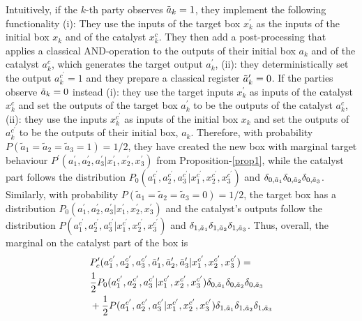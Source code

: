\documentclass[pra,aps,reprint,superscriptaddress]{revtex4-2}
\theoremstyle{theorem}
\begin{document}
 Intuitively, if the $k$-th party observes $\Tilde{a}_k=1$, they implement the following functionality (i): They use the inputs of the target box $x^\prime_k$ as the inputs of the initial box $x_k$ and of the catalyst $x^c_k$. They then add a post-processing that applies a classical AND-operation to the outputs of their initial box $a_k$ and of the catalyst $a^c_k$, which generates the target output $a^\prime_k$, (ii): they deterministically set the output $a^{c^\prime}_k=1$ and they prepare a classical register $\Tilde{a}^\prime_k = 0$.  If the parties observe $\Tilde{a}_k=0$ instead (i): they use the target inputs $x_k^\prime$ as inputs of the catalyst $x^c_k$ and set the outputs of the target box $a^\prime_k$ to be the outputs of the catalyst $a^c_k$, (ii): they use the inputs $x^{c^\prime}_k$ as inputs of the initial box $x_k$ and set the outputs of  $a^{c^\prime}_k$ to be the outputs of their initial box, $a_k$. Therefore, with probability $P(\tilde a_1 = \tilde a_2= \tilde a_3=1)=1/2$, they have created the new box with marginal target behaviour $P^{\prime}(a^{\prime}_1,a^{\prime}_2,a^{\prime}_3|x^{\prime}_1,x^{\prime}_2,x^{\prime}_3)$ from Proposition-\ref{prop1}, while the catalyst part follows the distribution $P_0(a^{c^\prime}_1,a^{c^\prime}_2,a^{c^\prime}_3|x^{c^\prime}_1,x^{c^\prime}_2,x^{c^\prime}_3)$ and $\delta_{0,\Tilde{a}_1}\delta_{0,\Tilde{a}_2}\delta_{0,\Tilde{a}_3}$. Similarly, with probability $P(\tilde a_1 = \tilde a_2= \tilde a_3=0)=1/2$, the target box has a distribution $P_0(a^{\prime}_1,a^{\prime}_2,a^{\prime}_3|x^{\prime}_1,x^{\prime}_2,x^{\prime}_3)$ and the catalyst's outputs follow the distribution $P(a^{c^\prime}_1,a^{c^\prime}_2,a^{c^\prime}_3|x^{c^\prime}_1,x^{c^\prime}_2,x^{c^\prime}_3)$ and $\delta_{1,\Tilde{a}_1}\delta_{1,\Tilde{a}_2}\delta_{1,\Tilde{a}_3}$. Thus, overall, the marginal on the catalyst part of the box is
\begin{align}\nonumber
    &P_c^{\prime}(a^{c^\prime}_1,a^{c^\prime}_2,a^{c^\prime}_3,\Tilde{a}^\prime_1,\Tilde{a}^\prime_2,\Tilde{a}^\prime_3|x^{c^\prime}_1,x^{c^\prime}_2,x^{c^\prime}_3)=\\&\nonumber\frac{1}{2}P_0(a^{c^\prime}_1,a^{c^\prime}_2,a^{c^\prime}_3|x^{c^\prime}_1,x^{c^\prime}_2,x^{c^\prime}_3)\delta_{0,\Tilde{a}_1}\delta_{0,\Tilde{a}_2}\delta_{0,\Tilde{a}_3}\\&+
    \frac{1}{2}P(a^{c^\prime}_1,a^{c^\prime}_2,a^{c^\prime}_3|x^{c^\prime}_1,x^{c^\prime}_2,x^{c^\prime}_3)\delta_{1,\Tilde{a}_1}\delta_{1,\Tilde{a}_2}\delta_{1,\Tilde{a}_3}
\end{align}
\end{document}
